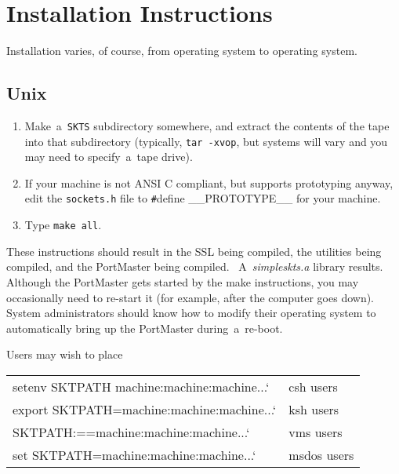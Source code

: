 \documentclass[12pt]{article}
\def\SSL{{\small SSL}}
\begin{document}
\newpage
\section{Installation Instructions}

Installation varies, of course, from operating system to operating system.


\subsection{Unix}

\begin{enumerate}

  \item Make~a~{\tt SKTS} subdirectory somewhere, and extract the contents
    of the tape into that subdirectory (typically, {\tt tar -xvop}, but
    systems will vary and you may need to specify~a~tape drive).

  \item If your machine is not {\small ANSI C} compliant, but supports
    prototyping anyway, edit the \verb`sockets.h` file to \verb`#`define {\small
    \_\_PROTOTYPE\_\_} for your machine.

  \item Type {\tt make all}.

\end{enumerate}

These instructions should result in the {\SSL} being compiled, the utilities
being compiled, and the PortMaster being compiled. ~A~{\em simpleskts.a}
library results.  Although the PortMaster gets started by the make
instructions, you may occasionally need to re-start it (for example, after the
computer goes down).  System administrators should know how to modify their
operating system to automatically bring up the PortMaster during~a~re-boot.

Users may wish to place 

\begin{center}
  \begin{tabular}{ll}
    setenv SKTPATH machine:machine:machine...` & csh users   \\
    export SKTPATH=machine:machine:machine...` & ksh users   \\
    SKTPATH:==machine:machine:machine...`      & vms users   \\
    set SKTPATH=machine:machine:machine...`    & msdos users \\
  \end{tabular}
\end{center}
\end{document}
